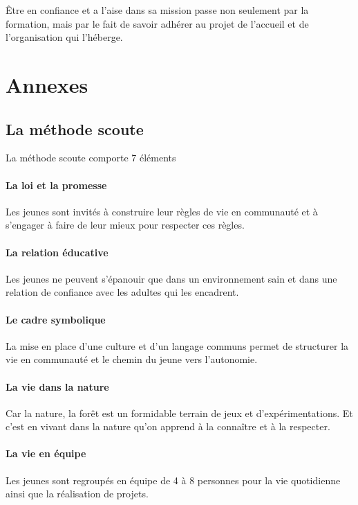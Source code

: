 \documentclass[titlepage,11pt,a4paper]{article}
\begin{document}
Être en confiance et a l'aise dans sa mission passe non seulement par la formation, mais
par le fait de savoir adhérer au projet de l'accueil et de l'organisation qui l'héberge.

\newpage
\section{Annexes}

\subsection{\label{methsc}La méthode scoute}

La méthode scoute comporte 7 éléments

\paragraph{La loi et la promesse} Les jeunes sont invités à construire leur règles de vie
en communauté et à s'engager à faire de leur mieux pour respecter ces règles.

\paragraph{La relation éducative} Les jeunes ne peuvent s'épanouir que dans un
environnement sain et dans une relation de confiance avec les adultes qui les encadrent.

\paragraph{Le cadre symbolique} La mise en place d'une culture et d'un langage communs
permet de structurer la vie en communauté et le chemin du jeune vers l'autonomie.

\paragraph{La vie dans la nature} Car la nature, la forêt est un formidable terrain de jeux
et d'expérimentations. Et c'est en vivant dans la nature qu'on apprend à la connaître et à
la respecter.

\paragraph{La vie en équipe} Les jeunes sont regroupés en équipe de 4 à 8 personnes pour
la vie quotidienne ainsi que la réalisation de projets.
\end{document}
